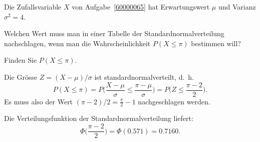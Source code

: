 Die Zufallsvariable $X$ von Aufgabe~\ref{60000065} hat Erwartungswert
$\mu$ und Varianz $\sigma^2=4$.
\begin{teilaufgaben}
\item
Welchen Wert muss man in einer Tabelle der Standardnormalverteilung
nachschlagen, wenn man die Wahrscheinlichkeit $P(X\le \pi)$ bestimmen
will?
\item
Finden Sie $P(X\le \pi)$.
\end{teilaufgaben}

\begin{loesung}
\begin{teilaufgaben}
\item
Die Grösse $Z=(X-\mu)/\sigma$ ist standardnormalverteilt, d.~h.
\[
P(X\le \pi)
=
P\biggl(
\frac{X-\mu}{\sigma}
\le
\frac{\pi-\mu}{\sigma}
\biggr)
=
P\biggl(
Z
\le
\frac{\pi-2}{2}
\biggr).
\]
Es muss also der Wert $(\pi-2)/2 = \frac{\pi}2-1$ nachgeschlagen werden.
\item
Die Verteilungsfunktion der Standardnormalverteilung liefert:
\[
\Phi\biggl(
\frac{\pi-2}{2}
\biggr)
=
\Phi(0.571)
=
0.7160.
\]
\qedhere
\end{teilaufgaben}
\end{loesung}
